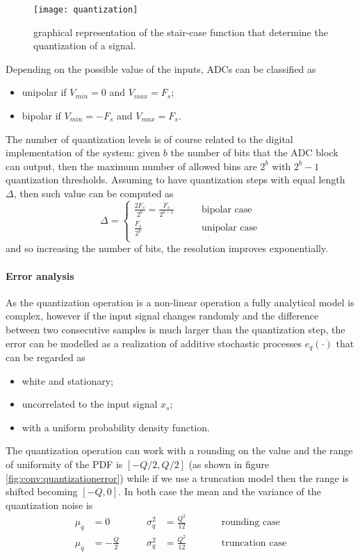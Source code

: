 			\begin{SCfigure}[2][bht]
				\centering
				\texttt{[image: quantization]}
				\caption{graphical representation of the stair-case function that determine the quantization of a signal.} \label{fig:conv:quantization}
			\end{SCfigure} 
			
			\noindent
			Depending on the possible value of the inputs, ADCs can be classified as
			\begin{itemize}
				\item unipolar if $V_{min} = 0$ and $V_{max} = F_s$;
				\item bipolar if $V_{min} = - F_s$ and $V_{max} = F_s$.
			\end{itemize}
			The number of quantization levels is of course related to the digital implementation of the system: given $b$ the number of bits that the ADC block can output, then the maximum number of allowed bins are $2^b$ with $2^b-1$ quantization thresholds. Assuming to have quantization steps with equal length $\Delta$, then such value can be computed as
			\begin{equation}
				\Delta = \begin{cases}
					\frac{2F_s}{2^b} = \frac{F_s}{2^{b-1}} \qquad & \text{bipolar case} \\
					\frac{F_s}{2^b} \qquad & \text{unipolar case} \\
				\end{cases}
			\end{equation}
			and so increasing the number of bits, the resolution improves exponentially.
			
			\paragraph{Error analysis} As the quantization operation is a non-linear operation a fully analytical model is complex, however if the input signal changes randomly and the difference between two consecutive samples is much larger than the quantization step, the error can be modelled as a realization of additive stochastic processes $e_q(\cdot)$ that can be regarded as
			\begin{itemize}
				\item white and stationary;
				\item uncorrelated to the input signal $x_s$;
				\item with a uniform probability density function.
			\end{itemize} 
			The quantization operation can work with a rounding on the value and the range of uniformity of the PDF is $[-Q/2,Q/2]$ (as shown in figure \ref{fig:conv:quantizationerror}) while if we use a truncation model then the range is shifted becoming $[-Q,0]$. In both case the mean and the variance of the quantization noise is
			\begin{align*}
				\mu_q & = 0 \qquad & \sigma_q^2 & = \frac{Q^2}{12} \qquad && \text{rounding case} \\
				\mu_q & = -\frac Q2 \qquad & \sigma_q^2 & = \frac{Q^2}{12} \qquad && \text{truncation case}
			\end{align*}
		
